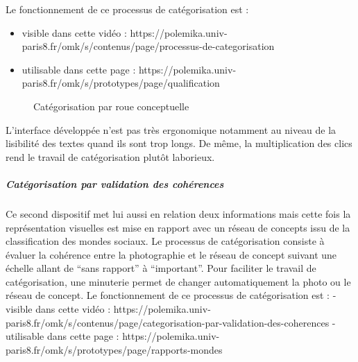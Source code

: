 \documentclass[
  a4paper,
  DIV=11,
  numbers=noendperiod]{scrreprt}
\let\oldsubparagraph\subparagraph
\renewcommand{\subparagraph}[1]{\oldsubparagraph{#1}\mbox{}}
\begin{document}
Le fonctionnement de ce processus de catégorisation est :

\begin{itemize}
\item
  visible dans cette vidéo :
  https://polemika.univ-paris8.fr/omk/s/contenus/page/processus-de-categorisation
\item
  utilisable dans cette page :
  https://polemika.univ-paris8.fr/omk/s/prototypes/page/qualification
\end{itemize}

\begin{figure}


\caption{\label{fig-polemikaRoue}Catégorisation par roue conceptuelle}

\end{figure}%

L'interface développée n'est pas très ergonomique notamment au niveau de
la lisibilité des textes quand ils sont trop longs. De même, la
multiplication des clics rend le travail de catégorisation plutôt
laborieux.

\subparagraph{Catégorisation par validation des
cohérences}\label{catuxe9gorisation-par-validation-des-cohuxe9rences}

Ce second dispositif met lui aussi en relation deux informations mais
cette fois la représentation visuelles est mise en rapport avec un
réseau de concepts issu de la classification des mondes sociaux. Le
processus de catégorisation consiste à évaluer la cohérence entre la
photographie et le réseau de concept suivant une échelle allant de
``sans rapport'' à ``important''. Pour faciliter le travail de
catégorisation, une minuterie permet de changer automatiquement la photo
ou le réseau de concept. Le fonctionnement de ce processus de
catégorisation est : - visible dans cette vidéo :
https://polemika.univ-paris8.fr/omk/s/contenus/page/categorisation-par-validation-des-coherences
- utilisable dans cette page :
https://polemika.univ-paris8.fr/omk/s/prototypes/page/rapports-mondes
\end{document}

